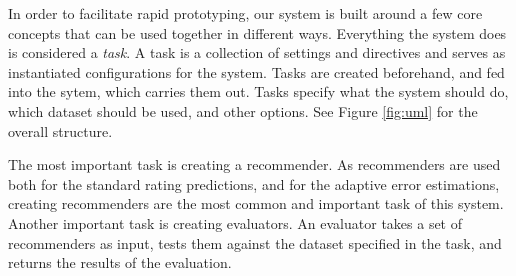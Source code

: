 \begin{figure}[t]
  \begin{center}
  \end{center}
\end{figure}

In order to facilitate rapid prototyping,
our system is built around a few core concepts that can
be used together in different ways.
Everything the system does is considered a \emph{task}.
A task is a collection of settings and directives
and serves as instantiated configurations for the system.
Tasks are created beforehand, and fed into the sytem,
which carries them out.
Tasks specify what the system should do,
which dataset should be used, and other options.
See Figure \ref{fig:uml} for the overall structure.

The most important task is creating a recommender.
As recommenders are used both for the standard rating predictions,
and for the adaptive error estimations, creating recommenders
are the most common and important task of this system.
Another important task is creating evaluators.
An evaluator takes a set of recommenders as input,
tests them against the dataset specified in the task,
and returns the results of the evaluation.




